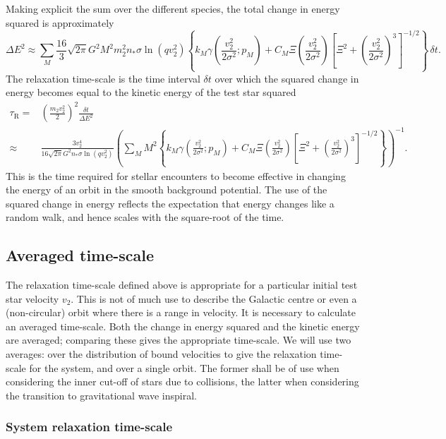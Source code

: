 \documentclass[useAMS,usedcolumn,usegraphicx,usenatbib]{mn2e}
\newcommand{\sub}[1]{\ensuremath{_\mathrm{#1}}}
\begin{document}
\begin{onecolumn}
Making explicit the sum over the different species, the total change in energy squared is approximately
\begin{equation}
\Delta E^2 \approx \sum_M \frac{16}{3}\sqrt{2\pi}G^2 M^2m_2^2n_\ast\sigma\ln\left(qv_2^2\right) \left\{k_M \gamma\left(\frac{v_2^2}{2\sigma^2};p_M\right) + C_M\Xi\left(\frac{v_2^2}{2\sigma^2}\right)\left[\Xi^2 + \left(\frac{v_2^2}{2\sigma^2}\right)^3\right]^{-1/2}\right\}\,\delta t.
\end{equation}
The relaxation time-scale is the time interval $\delta t$ over which the squared change in energy becomes equal to the kinetic energy of the test star squared
\begin{align}
\tau\sub{R} = {} & \left(\frac{m_2v_2^2}{2}\right)^2\frac{\delta t}{\Delta E^2} \\
 \approx {} & \frac{3v_2^4}{16\sqrt{2\pi}G^2n_\ast\sigma\ln\left(qv_2^2\right)} \left(\sum_M M^2 \left\{k_M \gamma\left(\frac{v_2^2}{2\sigma^2};p_M\right) + C_M\Xi\left(\frac{v_2^2}{2\sigma^2}\right)\left[\Xi^2 + \left(\frac{v_2^2}{2\sigma^2}\right)^3\right]^{-1/2}\right\}\right)^{-1}.
\end{align}
This is the time required for stellar encounters to become effective in changing the energy of an orbit in the smooth background potential. The use of the squared change in energy reflects the expectation that energy changes like a random walk, and hence scales with the square-root of the time.

\subsection{Averaged time-scale}

The relaxation time-scale defined above is appropriate for a particular initial test star velocity $v_2$. This is not of much use to describe the Galactic centre or even a (non-circular) orbit where there is a range in velocity. It is necessary to calculate an averaged time-scale. Both the change in energy squared and the kinetic energy are averaged; comparing these gives the appropriate time-scale. We will use two averages: over the distribution of bound velocities to give the relaxation time-scale for the system, and over a single orbit. The former shall be of use when considering the inner cut-off of stars due to collisions, the latter when considering the transition to gravitational wave inspiral.

\subsubsection{System relaxation time-scale}\label{sec:system-ave}


\end{onecolumn}
\end{document}
